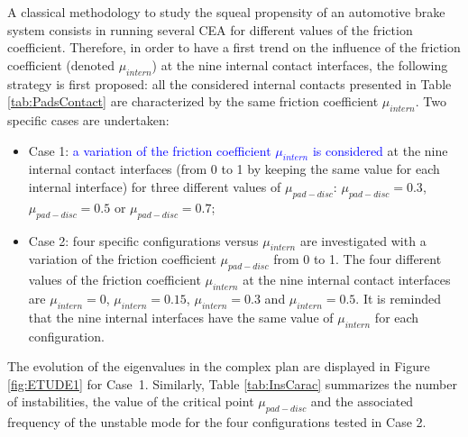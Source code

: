\documentclass[final,1p]{elsarticle}
\newcommand{\tb}[1]{\textcolor{blue}{#1}}
\begin{document}
A classical methodology to study the squeal propensity of an automotive brake system consists in running several CEA for different values of the friction coefficient. Therefore, in order to have a first trend on the influence of the friction coefficient (denoted $\mu_{intern}$) at the nine internal contact interfaces, the following strategy is first proposed: all the considered internal contacts presented in Table \ref{tab:PadsContact} are characterized by the same friction coefficient $\mu_{intern}$. Two specific cases are undertaken:
\begin{itemize}
	\item Case 1: \tb{a variation of the friction coefficient $\mu_{intern}$ is considered} at the nine internal contact interfaces (from 0 to 1 by keeping the same value for each internal interface) for three different values of $\mu_{pad-disc}$: $\mu_{pad-disc} = 0.3$, $\mu_{pad-disc} = 0.5$ or $\mu_{pad-disc} = 0.7$;
		\item Case 2: four specific configurations versus $\mu_{intern}$ are investigated with a variation of the friction coefficient $\mu_{pad-disc}$ from 0 to 1.  The four different values of the friction coefficient $\mu_{intern}$ at the nine internal contact interfaces are  $\mu_{intern}=0$, $\mu_{intern}=0.15$, $\mu_{intern}=0.3$ and $\mu_{intern}=0.5$. It is reminded that the nine internal interfaces have the same value of $\mu_{intern}$ for each configuration.
\end{itemize}

The evolution of the eigenvalues in the complex plan are displayed in Figure \ref{fig:ETUDE1} for Case~1. Similarly, Table \ref{tab:InsCarac} summarizes the number of instabilities, the value of the critical point $\mu_{pad-disc}$ and the associated frequency of the unstable mode for the four configurations tested in Case 2.
\end{document}
